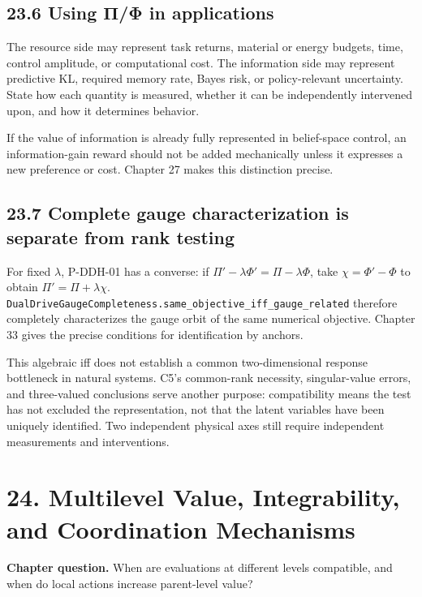 \documentclass[
  english,
  11pt,
  oneside]{book}
\begin{document}
\section{23.6 Using Π/Φ in applications}\label{using-ux3c0ux3c6-in-applications}

The resource side may represent task returns, material or energy budgets, time, control amplitude, or computational cost. The information side may represent predictive KL, required memory rate, Bayes risk, or policy-relevant uncertainty. State how each quantity is measured, whether it can be independently intervened upon, and how it determines behavior.

If the value of information is already fully represented in belief-space control, an information-gain reward should not be added mechanically unless it expresses a new preference or cost. Chapter 27 makes this distinction precise.

\section{23.7 Complete gauge characterization is separate from rank testing}\label{complete-gauge-characterization-is-separate-from-rank-testing}

For fixed \(\lambda\), P-DDH-01 has a converse: if \(\Pi'-\lambda\Phi'=\Pi-\lambda\Phi\), take \(\chi=\Phi'-\Phi\) to obtain \(\Pi'=\Pi+\lambda\chi\). \nolinkurl{DualDriveGaugeCompleteness.same_objective_iff_gauge_related} therefore completely characterizes the gauge orbit of the same numerical objective. Chapter 33 gives the precise conditions for identification by anchors.

This algebraic iff does not establish a common two-dimensional response bottleneck in natural systems. C5's common-rank necessity, singular-value errors, and three-valued conclusions serve another purpose: compatibility means the test has not excluded the representation, not that the latent variables have been uniquely identified. Two independent physical axes still require independent measurements and interventions.

\chapter{24. Multilevel Value, Integrability, and Coordination Mechanisms}\label{ch-24}

\textbf{Chapter question.} When are evaluations at different levels compatible, and when do local actions increase parent-level value?
\end{document}
